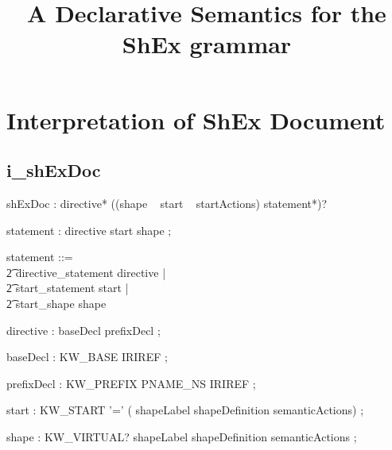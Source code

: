 \documentclass{article}
\title{A Declarative Semantics for the ShEx grammar}
\def\bnf#1{{\scriptsize {{#1}} }}
\begin{document}
\maketitle
\tableofcontents
\pagebreak




\pagebreak
\section{Interpretation of ShEx Document}
\subsection{i\_shExDoc}
\begin{framed}
\noindent
\bnf{shExDoc : directive* ((shape \textbar~ start \textbar~ startActions) statement*)?}
\end{framed}
\noindent
\begin{framed}
\noindent
\bnf{statement       : directive \textbar  start \textbar  shape ;}
\end{framed}
\noindent

\begin{zed}
statement ::= \\
\t2 directive\_statement \ldata directive \rdata | \\
\t2 start\_statement \ldata start \rdata | \\
\t2 start\_shape \ldata shape \rdata
\end{zed}

\begin{framed}
\noindent
\bnf{directive       : baseDecl \textbar  prefixDecl ;}
\end{framed}


\begin{framed}
\noindent
\bnf{baseDecl        : KW\_BASE IRIREF ;}
\end{framed}


\begin{framed}
\noindent
\bnf{prefixDecl      : KW\_PREFIX PNAME\_NS IRIREF ;}
\end{framed}


\begin{framed}
\noindent
\bnf{start           : KW\_START '=' ( shapeLabel \textbar  shapeDefinition semanticActions)  ;}
\end{framed}


\begin{framed}
\noindent
\bnf{shape           : KW\_VIRTUAL? shapeLabel shapeDefinition semanticActions ;}
\end{framed}
\end{document}
